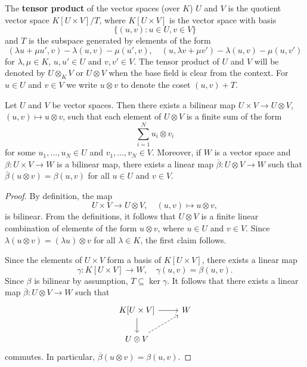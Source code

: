 
The \textbf{tensor product} of the vector spaces (over $K$) $U$ and $V$ 
is the quotient vector space $K[U\times V]/T$, where $K[U\times V]$ 
is the vector space with basis 
\[
\{(u,v):u\in U,v\in V\}
\]
and $T$ is the subspace 
generated by elements of the form 
\[
		(\lambda u+\mu u',v)-\lambda(u,v)-\mu(u',v),\quad
		(u,\lambda v+\mu v')-\lambda(u,v)-\mu(u,v')
	\]
for $\lambda,\mu\in K$, $u,u'\in U$ and $v,v'\in V$.
The tensor product of $U$ and $V$ will be denoted by $U\otimes_KV$ or 
$U\otimes V$ when the base field is clear from the context. For $u\in U$ and 
$v\in V$ we write $u\otimes v$ to denote the coset $(u,v)+T$.

\begin{theorem}
	Let $U$ and $V$ be vector spaces. Then there exists a bilinear map 
	$U\times V\to U\otimes V$, $(u,v)\mapsto u\otimes v$, such that 
	each element of $U\otimes V$ is a finite sum of the form 
	\[
		\sum_{i=1}^N u_i\otimes v_i
	\]
	for some $u_1,\dots,u_N\in U$ and $v_1,\dots,v_N\in V$. 
	Moreover, if $W$ is a vector space and $\beta\colon U\times V\to W$ is a bilinear map, 
	there exists a linear map 
	$\overline{\beta}\colon U\otimes V\to W$ such that $\overline{\beta}(u\otimes
	v)=\beta(u,v)$ for all $u\in U$ and $v\in V$.
\end{theorem}

\begin{proof}
    By definition, the map
    \[
	U\times V\to U\otimes V,\quad
	(u,v)\mapsto u\otimes v,
	\]
	is bilinear. From the definitions, it follows that
	$U\otimes V$ is a finite linear combination of elements of the form 
	$u\otimes v$, where $u\in U$ and $v\in V$. Since $\lambda(u\otimes
	v)=(\lambda u)\otimes v$ for all $\lambda\in K$, the first claim follows.

	Since the elements of $U\times V$ form a basis of $K[U\times V]$, there exists
	a linear map 
	\[
		\gamma\colon K[U\times V]\to W,\quad
	\gamma(u,v)=\beta(u,v). 
	\]
	Since $\beta$ is bilinear by assumption, $T\subseteq\ker\gamma$. It follows that there exists 
	a linear map $\overline{\beta}\colon U\otimes V\to
	W$ such that  
	\[
	\begin{tikzcd}
		K[U\times V] \arrow[r]\arrow[d] & W \\
		U\otimes V\arrow[ur, dashrightarrow]
	\end{tikzcd}
	\]
	commutes. In particular, $\overline{\beta}(u\otimes v)=\beta(u,v)$. 
\end{proof}

